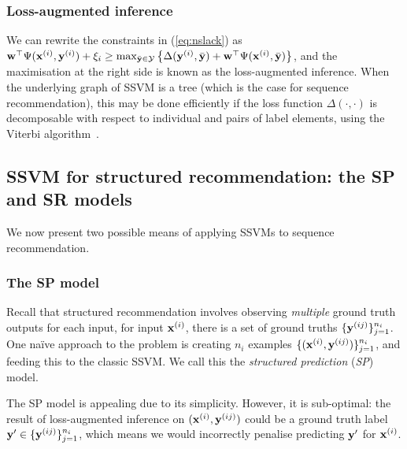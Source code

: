 \subsubsection{Loss-augmented inference}
We can rewrite the constraints in (\ref{eq:nslack}) as
$\mathbf{w}^\top \Psi(\mathbf{x}^{({i})}, \mathbf{y}^{({i})}) + \xi_i \ge
\max_{\bar{\mathbf{y}} \in \mathcal{Y}} \left\{ \Delta(\mathbf{y}^{({i})}, \bar{\mathbf{y}}) + \mathbf{w}^\top \Psi(\mathbf{x}^{({i})}, \bar{\mathbf{y}}) \right\}$,
and the maximisation at the right side is known as the loss-augmented inference.
When the underlying graph of SSVM is a tree (which is the case for sequence recommendation),
this may be done efficiently if the loss function $\Delta(\cdot,\cdot)$ is decomposable
with respect to individual and pairs of label elements,
\eg using the Viterbi algorithm~\cite{joachims2009predicting}.

\subsection{SSVM for structured recommendation: the SP and SR models}
\label{ssec:sr}

We now present two possible means of applying SSVMs to sequence recommendation.

\subsubsection{The SP model}
Recall that structured recommendation
involves observing \emph{multiple} ground truth outputs for each input, \ie
for input $\mathbf{x}^{({i})}$, there is a set of ground truths $\{\mathbf{y}^{({ij})}\}_{j=1}^{n_i}$.
One na\"{i}ve approach to the problem
is creating
$n_i$ examples $\{(\mathbf{x}^{({i})}, \mathbf{y}^{({ij})})\}_{j=1}^{n_i}$,
and feeding this to the classic SSVM. %
We call this the \emph{structured prediction} (\emph{SP}) model.

The SP model is appealing due to its simplicity.
However, it is sub-optimal:
the result of loss-augmented inference on $(\mathbf{x}^{({i})}, \mathbf{y}^{({ij})})$ could be a ground truth label $\mathbf{y}' \in \{\mathbf{y}^{({ij})}\}_{j=1}^{n_i}$,
which means we would incorrectly penalise predicting $\mathbf{y}'$ for $\mathbf{x}^{({i})}$.

